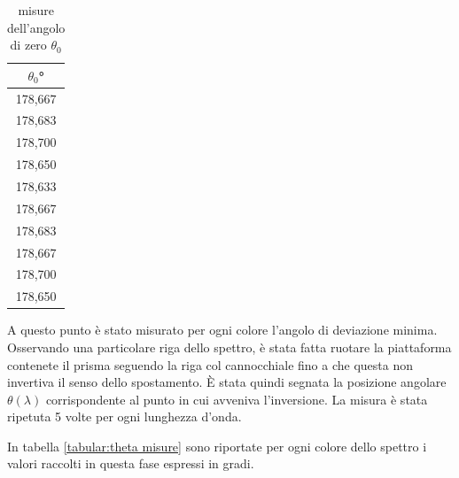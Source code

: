 \documentclass{article}
\begin{document}
        \begin{table}[H]

            \centering
            \begin{tabular}{c}

                \toprule 
                $\theta_0$° \\

                \midrule
                178,667\\
                178,683\\
                178,700\\
                178,650\\
                178,633\\
                178,667\\
                178,683\\
                178,667\\
                178,700\\
                178,650\\
                \bottomrule

            \end{tabular}

            \caption{misure dell'angolo di zero $\theta_0$}
            \label{tabular:theta zero}

        \end{table}

        A questo punto è stato misurato per ogni colore l'angolo di deviazione minima. 
        Osservando una particolare riga dello spettro, è stata fatta ruotare la piattaforma contenete il prisma seguendo la riga col cannocchiale 
        fino a che questa non invertiva il senso dello spostamento. È stata quindi segnata la posizione angolare $\theta(\lambda)$ corrispondente 
        al punto in cui avveniva l'inversione. La misura è stata ripetuta 5 volte per ogni lunghezza d'onda. 

        In tabella \ref{tabular:theta misure} sono riportate per ogni colore dello spettro i valori raccolti in questa fase espressi in gradi.
\end{document}
